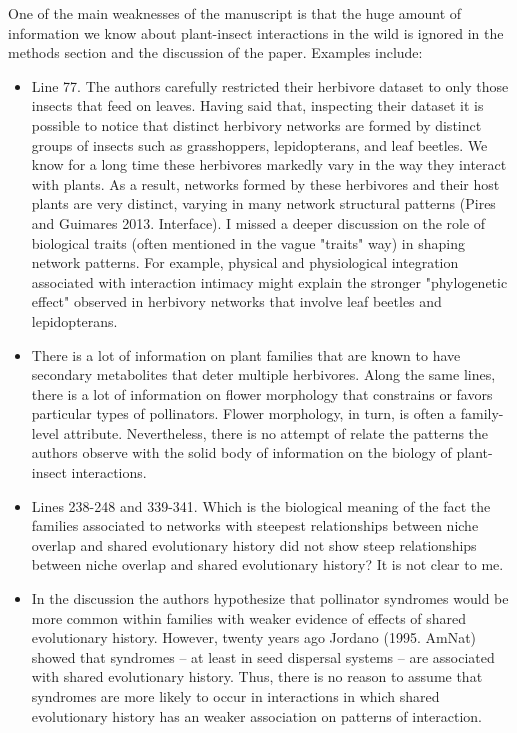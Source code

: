 \documentclass[12pt]{letter}
\newenvironment{refquote}{\bigskip \begin{it}}{\end{it}\smallskip}
\begin{document}
    \begin{refquote}

      One of the main weaknesses of the manuscript is that the huge amount of information we know about plant-insect interactions in the wild is ignored in the methods section and the discussion of the paper. Examples include:

      \begin{itemize}

      \item Line 77. The authors carefully restricted their herbivore dataset to only those insects that feed on leaves. Having said that, inspecting their dataset it is possible to notice that distinct herbivory networks are formed by distinct groups of insects such as grasshoppers, lepidopterans, and leaf beetles. We know for a long time these herbivores markedly vary in the way they interact with plants. As a result, networks formed by these herbivores and their host plants are very distinct, varying in many network structural patterns (Pires and Guimares 2013. Interface). I missed a deeper discussion on the role of biological traits (often mentioned in the vague "traits" way) in shaping network patterns. For example, physical and physiological integration associated with interaction intimacy might explain the stronger "phylogenetic effect" observed in herbivory networks that involve leaf beetles and lepidopterans.

      \item There is a lot of information on plant families that are known to have secondary metabolites that deter multiple herbivores. Along the same lines, there is a lot of information on flower morphology that constrains or favors particular types of pollinators. Flower morphology, in turn, is often a family-level attribute. Nevertheless, there is no attempt of relate the patterns the authors observe with the solid body of information on the biology of plant-insect interactions.


      \item Lines 238-248 and 339-341. Which is the biological meaning of the fact the families associated to networks with steepest relationships between niche overlap and shared evolutionary history did not show steep relationships between niche overlap and shared evolutionary history? It is not clear to me.


      \item In the discussion the authors hypothesize that pollinator syndromes would be more common within families with weaker evidence of effects of shared evolutionary history. However, twenty years ago Jordano (1995. AmNat) showed that syndromes – at least in seed dispersal systems – are associated with shared evolutionary history. Thus, there is no reason to assume that syndromes are more likely to occur in interactions in which shared evolutionary history has an weaker association on patterns of interaction.

    \end{itemize}
    \end{refquote}
\end{document}
